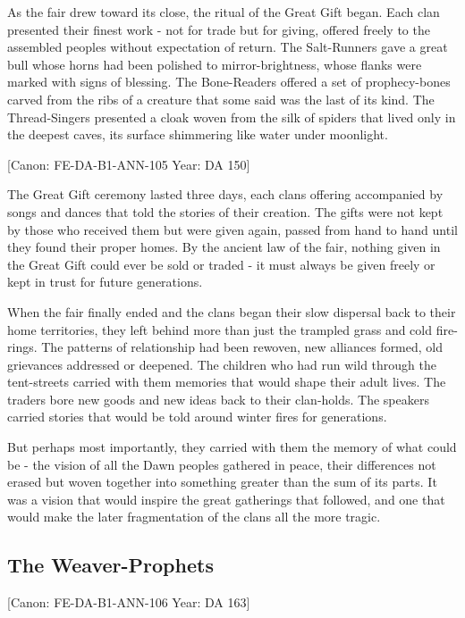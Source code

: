 As the fair drew toward its close, the ritual of the Great Gift began.
Each clan presented their finest work - not for trade but for giving,
offered freely to the assembled peoples without expectation of return.
The Salt-Runners gave a great bull whose horns had been polished to
mirror-brightness, whose flanks were marked with signs of blessing. The
Bone-Readers offered a set of prophecy-bones carved from the ribs of a
creature that some said was the last of its kind. The Thread-Singers
presented a cloak woven from the silk of spiders that lived only in the
deepest caves, its surface shimmering like water under moonlight.

{[}Canon: FE-DA-B1-ANN-105 \textbar{} Year: DA 150{]}

The Great Gift ceremony lasted three days, each clan\textquotesingle s
offering accompanied by songs and dances that told the stories of their
creation. The gifts were not kept by those who received them but were
given again, passed from hand to hand until they found their proper
homes. By the ancient law of the fair, nothing given in the Great Gift
could ever be sold or traded - it must always be given freely or kept in
trust for future generations.

When the fair finally ended and the clans began their slow dispersal
back to their home territories, they left behind more than just the
trampled grass and cold fire-rings. The patterns of relationship had
been rewoven, new alliances formed, old grievances addressed or
deepened. The children who had run wild through the tent-streets carried
with them memories that would shape their adult lives. The traders bore
new goods and new ideas back to their clan-holds. The speakers carried
stories that would be told around winter fires for generations.

But perhaps most importantly, they carried with them the memory of what
could be - the vision of all the Dawn peoples gathered in peace, their
differences not erased but woven together into something greater than
the sum of its parts. It was a vision that would inspire the great
gatherings that followed, and one that would make the later
fragmentation of the clans all the more tragic.

\subsection{The Weaver-Prophets}\label{the-weaver-prophets}

{[}Canon: FE-DA-B1-ANN-106 \textbar{} Year: DA 163{]}

